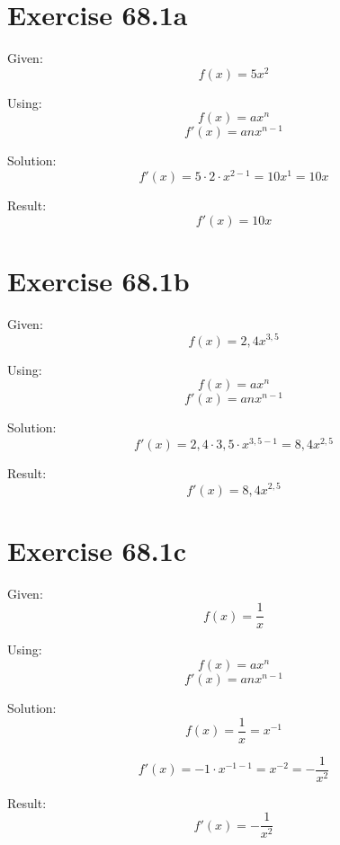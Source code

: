 \documentclass[a4paper, 10pt]{scrartcl}
\begin{document}
\section{Exercise 68.1a}

Given:
\[f(x) = 5x^{2}\]

Using:
\[f(x) = ax^{n}\]
\[f'(x) = anx^{n - 1}\]

Solution:
\[f'(x) = 5\cdot2\cdot x^{2 - 1} = 10x^{1} = 10x\]

Result:
\[f'(x) = 10x\]

\section{Exercise 68.1b}

Given:
\[f(x) = 2,4x^{3,5}\]

Using:
\[f(x) = ax^{n}\]
\[f'(x) = anx^{n - 1}\]

Solution:
\[f'(x) = 2,4\cdot3,5\cdot x^{3,5 - 1} = 8,4x^{2,5}\]

Result:
\[f'(x) = 8,4x^{2,5}\]

\section{Exercise 68.1c}

Given:
\[f(x) = \frac{1}{x}\]

Using:
\[f(x) = ax^{n}\]
\[f'(x) = anx^{n - 1}\]

Solution:
\[f(x) = \frac{1}{x} = x^{-1}\]

\[f'(x) = -1\cdot x^{-1 - 1} = x^{-2} = -\frac{1}{x^{2}}\]

Result:
\[f'(x) = -\frac{1}{x^{2}}\]
\end{document}

